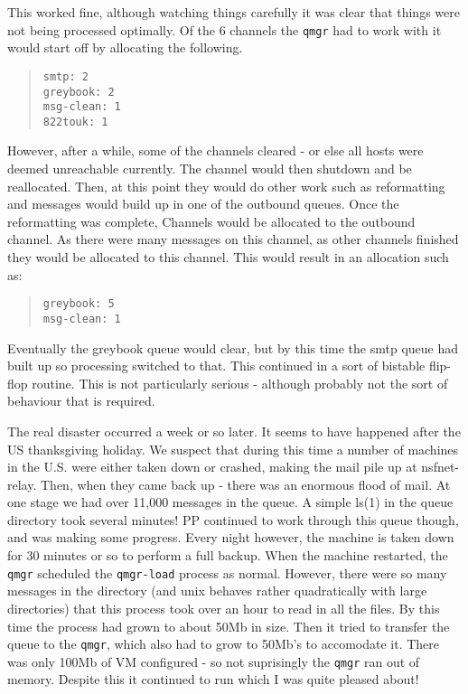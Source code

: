 This worked fine, although watching things carefully it was clear that
things were not being processed optimally. Of the 6 channels the \verb|qmgr|
had to work with it would start off by allocating the following.
\begin{quote}
\small
\begin{verbatim}
smtp: 2
greybook: 2
msg-clean: 1
822touk: 1
\end{verbatim}
\end{quote}
However, after a while, some of the channels cleared - or else all
hosts were deemed unreachable currently. The channel would then
shutdown and be reallocated. Then, at this point they would do other
work such as reformatting and messages would build up in one of the
outbound queues. Once the reformatting was complete, Channels would be
allocated to the outbound channel. As there were many messages on this
channel, as other channels finished they would be allocated to this
channel. This would result in an allocation such as:
\begin{quote}
\small
\begin{verbatim}
greybook: 5
msg-clean: 1
\end{verbatim}
\end{quote}
Eventually the greybook queue would clear, but by this time the smtp
queue had built up so processing switched to that.
This continued in a sort of bistable flip-flop routine. This is not
particularly serious - although probably not the sort of behaviour that
is required.

The real disaster occurred a week or so later. It seems to have
happened after the US thanksgiving holiday. We suspect that during
this time a number of machines in the U.S. were either taken down or
crashed, making the mail pile up at nsfnet-relay. Then, when they came
back up - there was an enormous flood of mail. At one stage we had
over 11,000 messages in the queue. A simple ls(1) in the queue
directory took several minutes! PP continued to work through this
queue though, and was making some progress. Every night however, the
machine is taken down for 30 minutes or so to perform a full backup.
When the machine restarted, the \verb|qmgr| scheduled the
\verb|qmgr-load| process as normal.  However, there were so many
messages in the directory (and unix behaves rather quadratically with
large directories) that this process took over an hour to read in all
the files. By this time the process had grown to about 50Mb in size.
Then it tried to transfer the queue to the
\verb|qmgr|, which also had to grow to 50Mb's to accomodate it. There was only
100Mb of VM configured - so not suprisingly the \verb|qmgr| ran out of
memory. Despite this it continued to run which I was quite pleased
about!

